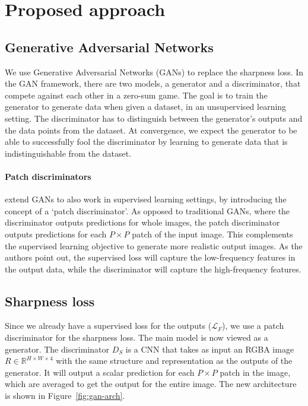 \section{Proposed approach}

\subsection{Generative Adversarial Networks}
    We use Generative Adversarial Networks (GANs) to replace the sharpness loss.
    In the GAN framework, there are two models, a generator and a discriminator, that compete against each other in a zero-sum game.
    The goal is to train the generator to generate data when given a dataset, in an unsupervised learning setting.
    The discriminator has to distinguish between the generator's outputs and the data points from the dataset.
    At convergence, we expect the generator to be able to successfully fool the discriminator by learning to generate data that is indistinguishable from the dataset.

    \paragraph{Patch discriminators}
    \citet{pix2pix} extend GANs to also work in supervised learning settings, by introducing the concept of a `patch discriminator'.
    As opposed to traditional GANs, where the discriminator outputs predictions for whole images, the patch discriminator outputs predictions for each $P \times P$ patch of the input image.
    This complements the supervised learning objective to generate more realistic output images.
    As the authors point out, the supervised loss will capture the low-frequency features in the output data, while the discriminator will capture the high-frequency features.

\subsection{Sharpness loss}
    Since we already have a supervised loss for the outputs ($\mathcal{L}_F$), we use a patch discriminator for the sharpness loss.
    The main model is now viewed as a generator.
    The discriminator $D_S$ is a CNN that takes as input an RGBA image $R \in \mathbb{R}^{H \times W \times 4}$ with the same structure and representation as the outputs of the generator.
    It will output a scalar prediction for each $P \times P$ patch in the image, which are averaged to get the output for the entire image.
    The new architecture is shown in Figure~\ref{fig:gan-arch}.

